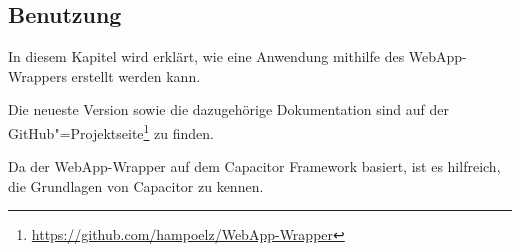 \subsection{Benutzung}
\label{sec:WebApp-Wrapper:Benutzung}

In diesem Kapitel wird erklärt, wie eine Anwendung mithilfe des WebApp-Wrappers erstellt werden kann.

Die neueste Version sowie die dazugehörige Dokumentation sind auf der GitHub"=Projektseite\footnote{\url{https://github.com/hampoelz/WebApp-Wrapper}} zu finden.

Da der WebApp-Wrapper auf dem Capacitor Framework basiert, ist es hilfreich, die Grundlagen von Capacitor zu kennen.


\clearpage

\clearpage

\clearpage

\clearpage

